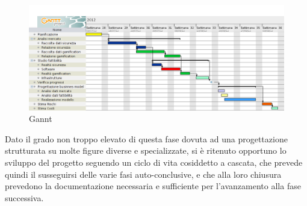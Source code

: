 \vspace*{0.5cm}

\begin{figure}[H]
\centering
\includegraphics[scale=0.4]{images/Gantt.png}
\caption{Gannt}
\end{figure}

\vspace*{0.5cm}

Dato il grado non troppo elevato di questa fase dovuta ad una progettazione strutturata su molte figure diverse e specializzate, si è ritenuto opportuno lo sviluppo del progetto seguendo un ciclo di vita cosiddetto a cascata, che prevede quindi il susseguirsi delle varie fasi auto-conclusive, e che alla loro chiusura prevedono la documentazione necessaria e sufficiente per l'avanzamento alla fase successiva.

